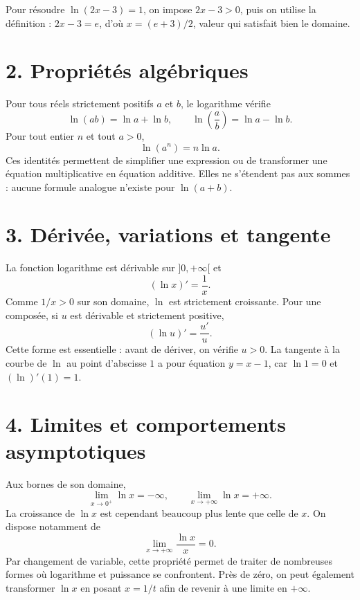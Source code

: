 \begin{exemple}
Pour résoudre $\ln(2x-3)=1$, on impose $2x-3>0$, puis on utilise la définition : $2x-3=e$, d’où $x=(e+3)/2$, valeur qui satisfait bien le domaine.
\end{exemple}

\section{2. Propriétés algébriques}
Pour tous réels strictement positifs $a$ et $b$, le logarithme vérifie
\[
\ln(ab)=\ln a+\ln b,\qquad \ln\!\left(\frac{a}{b}\right)=\ln a-\ln b.
\]
Pour tout entier $n$ et tout $a>0$,
\[
\ln(a^n)=n\ln a.
\]
Ces identités permettent de simplifier une expression ou de transformer une équation multiplicative en équation additive. Elles ne s’étendent pas aux sommes : aucune formule analogue n’existe pour $\ln(a+b)$.


\section{3. Dérivée, variations et tangente}
La fonction logarithme est dérivable sur $]0,+\infty[$ et
\[
(\ln x)'=\frac1x.
\]
Comme $1/x>0$ sur son domaine, $\ln$ est strictement croissante. Pour une composée, si $u$ est dérivable et strictement positive,
\[
(\ln u)'=\frac{u'}{u}.
\]
Cette forme est essentielle : avant de dériver, on vérifie $u>0$. La tangente à la courbe de $\ln$ au point d’abscisse $1$ a pour équation $y=x-1$, car $\ln 1=0$ et $(\ln)'(1)=1$.

\section{4. Limites et comportements asymptotiques}
Aux bornes de son domaine,
\[
\lim_{x\to0^+}\ln x=-\infty,\qquad \lim_{x\to+\infty}\ln x=+\infty.
\]
La croissance de $\ln x$ est cependant beaucoup plus lente que celle de $x$. On dispose notamment de
\[
\lim_{x\to+\infty}\frac{\ln x}{x}=0.
\]
Par changement de variable, cette propriété permet de traiter de nombreuses formes où logarithme et puissance se confrontent. Près de zéro, on peut également transformer $\ln x$ en posant $x=1/t$ afin de revenir à une limite en $+\infty$.

